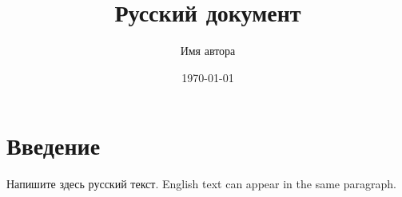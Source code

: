 \documentclass[11pt,a4paper]{article}
\title{Русский документ}
\author{Имя автора}
\date{\today}
\begin{document}
\maketitle
\section{Введение}
Напишите здесь русский текст. English text can appear in the same paragraph.
\end{document}
